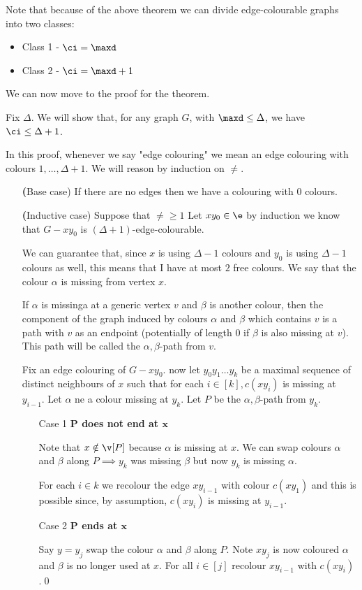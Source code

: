 Note that because of the above theorem we can divide edge-colourable graphs into two classes:
\begin{itemize}
    \item Class 1 - $\ci = \maxd$
    \item Class 2 - $\ci = \maxd + 1$
\end{itemize}
We can now move to the proof for the theorem.
\begin{prf}
    Fix $\Delta$. We will show that, for any graph $G$, with $\maxd \leq \Delta$, we have $\ci \leq \Delta + 1$.

    In this proof, whenever we say "edge colouring" we mean an edge colouring with colours $1, \dots, \Delta + 1$. We will reason by induction on $\ne$.
    \begin{itemize}
        \item[\textbf(Base case)] If there are no edges then we have a colouring with $0$ colours.
        \item[\textbf(Inductive case)] Suppose that $\ne \geq 1$ Let $xy_0 \in \e$ by induction we know that $G - xy_0$ is $(\Delta + 1)$-edge-colourable.
        
        We can guarantee that, since $x$ is using $\Delta - 1$ colours and $y_0$ is using $\Delta - 1$ colours as well, this means that I have at most $2$ free colours. We say that the colour $\alpha$ is missing from vertex $x$.

        If $\alpha$ is missinga at a generic vertex $v$ and $\beta$ is another colour, then the component of the graph induced by colours $\alpha$ and $\beta$ which contains $v$ is a path with $v$ as an endpoint (potentially of length $0$ if $\beta$ is also missing at $v$). This path will be called the $\alpha,\beta$-path from $v$.

        Fix an edge colouring of $G - xy_0$. now let $y_0y_1\dots y_k$ be a maximal sequence of distinct neighbours of $x$ such that for each $i \in [k], c(xy_i)$ is missing at $y_{i - 1}$. Let $\alpha$ ne a colour missing at $y_k$. Let $P$ be the $\alpha, \beta$-path from $y_k$.
        \begin{itemize}
            \item[Case 1] \textbf{$\bm{P}$ does not end at $\bm{x}$}
            
            Note that $x \notin \v[P]$ because $\alpha$ is missing at $x$. We can swap colours $\alpha$ and $\beta$ along $P \implies y_k$ was missing $\beta$ but now $y_k$ is missing $\alpha$.

            For each $i \in k$ we recolour the edge $xy_{i - 1}$ with colour $c(xy_1)$ and this is possible since, by assumption, $c(xy_i)$ is missing at $y_{i - 1}$.
            \item[Case 2] \textbf{$\bm{P}$ ends at $\bm{x}$}
            
            Say $y = y_j$ swap the colour $\alpha$ and $\beta$ along $P$. Note $xy_j$ is now coloured $\alpha$ and $\beta$ is no longer used at $x$. For all $i \in [j]$ recolour $xy_{i - 1}$ with $c(xy_i)$.\qed
        \end{itemize}
    \end{itemize}
\end{prf}